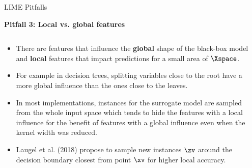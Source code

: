 \documentclass[11pt,compress,t,notes=noshow, xcolor=table]{beamer}
\begin{document}
\begin{vbframe}{LIME Pitfalls}

\textbf{Pitfall 3: Local vs. global features}

\begin{columns}
	\begin{column}{0.78\textwidth}
\begin{itemize}
	\item There are features that influence the \textbf{global} shape of the black-box model and \textbf{local} features that impact predictions for a small area of $\Xspace$. 
	\item For example in decision trees, splitting variables close to the root have a more global influence than the ones close to the leaves. 
	\item In most implementations, instances for the surrogate model are sampled from the whole input space which tends to hide the features with a local influence for the benefit of features with a global influence even when the kernel width was reduced. 
	\item Laugel et al. (2018) propose to sample new instances $\zv$ around the decision boundary closest from point $\xv$ for higher local accuracy.
\end{itemize}
\end{column}
\begin{column}{0.2\textwidth}


\end{column}
\end{columns}
\end{vbframe}
\end{document}
